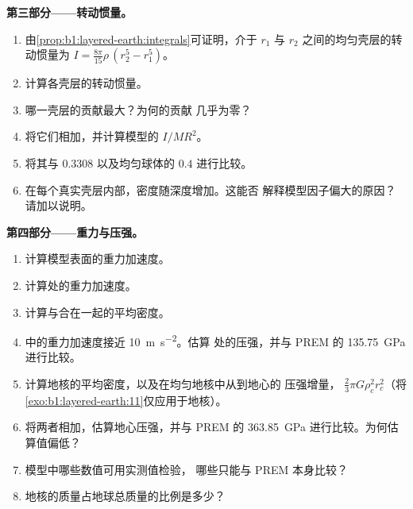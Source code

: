 \begin{problem}
\noindent\textbf{第三部分——转动惯量。}
\begin{enumerate}[resume]
  \item 由\cref{prop:b1:layered-earth:integrals}可证明，介于
        $r_1$ 与 $r_2$ 之间的均匀壳层的转动惯量为 $I = \tfrac{8\pi}{15}\rho\,(r_2^5 - r_1^5)$。
  \item 计算各壳层的转动惯量。
  \item 哪一壳层的贡献最大？为何的贡献
        几乎为零？
  \item 将它们相加，并计算模型的 $I/MR^2$。
  \item 将其与 $0.3308$ 以及均匀球体的 $0.4$ 进行比较。
  \item 在每个真实壳层内部，密度随深度增加。这能否
        解释模型因子偏大的原因？请加以说明。
\end{enumerate}

\noindent\textbf{第四部分——重力与压强。}
\begin{enumerate}[resume]
  \item 计算模型表面的重力加速度。
  \item 计算处的重力加速度。
  \item 计算与合在一起的平均密度。
  \item {}中的重力加速度接近 \qty{10}{m.s^{-2}}。估算
        处的压强，并与 PREM 的
        \qty{135.75}{GPa} 进行比较。
  \item 计算地核的平均密度，以及在均匀地核中从到地心的
        压强增量，
        $\tfrac23\pi G\rho_c^2 r_c^2$（将\cref{exo:b1:layered-earth:11}仅应用于地核）。
  \item 将两者相加，估算地心压强，并与 PREM 的
        \qty{363.85}{GPa} 进行比较。为何估算值偏低？
  \item 模型中哪些数值可用实测值检验，
        哪些只能与 PREM 本身比较？
  \item 地核的质量占地球总质量的比例是多少？
\end{enumerate}
\end{problem}
